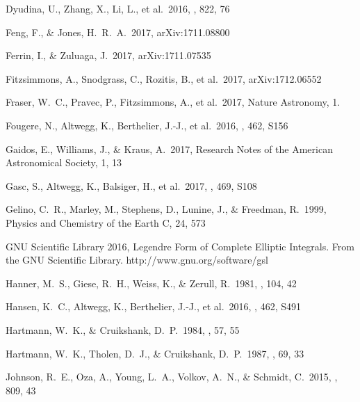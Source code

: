 \documentclass[a4paper,fleqn,usenatbib]{mnras}
\begin{document}
\begin{thebibliography}{99}
 Dyudina, U., Zhang, X., Li, L., et al.\ 2016, \apj, 822, 76 

 Feng, F., \& Jones, H.~R.~A.\ 2017, arXiv:1711.08800

 Ferrin, I., \& Zuluaga, J.\ 2017, arXiv:1711.07535

 Fitzsimmons, A., Snodgrass, C., Rozitis, B., et al.\ 2017, arXiv:1712.06552

 Fraser, W.~C., Pravec, P., Fitzsimmons, A., et al.\ 2017, Nature Astronomy, 1.

 Fougere, N., Altwegg, K., Berthelier, J.-J., et al.\ 2016, \mnras, 462, S156 

 Gaidos, E., Williams, J., \& Kraus, A.\ 2017, Research Notes of the American Astronomical Society, 1, 13

 Gasc, S., Altwegg, K., Balsiger, H., et al.\ 2017, \mnras, 469, S108 

 Gelino, C.~R., Marley, M., Stephens, D., Lunine, J., \& Freedman, R.\ 1999, Physics and Chemistry of the Earth C, 24, 573 

 GNU Scientific Library 2016, Legendre Form of Complete Elliptic Integrals. From the GNU Scientific Library. http://www.gnu.org/software/gsl

 Hanner, M.~S., Giese, R.~H., Weiss, K., \& Zerull, R.\ 1981, \aap, 104, 42 

 Hansen, K.~C., Altwegg, K., Berthelier, J.-J., et al.\ 2016, \mnras, 462, S491 

 Hartmann, W.~K., \& Cruikshank, D.~P.\ 1984, \icarus, 57, 55 

 Hartmann, W.~K., Tholen, D.~J., \& Cruikshank, D.~P.\ 1987, \icarus, 69, 33 

 Johnson, R.~E., Oza, A., Young, L.~A., Volkov, A.~N., \& Schmidt, C.\ 2015, \apj, 809, 43 


\end{thebibliography}
\end{document}
